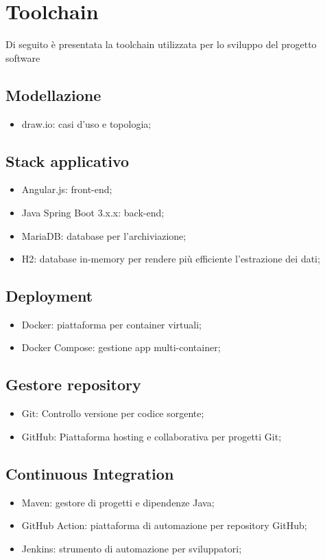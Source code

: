 \section{Toolchain}
Di seguito è presentata la toolchain utilizzata per lo sviluppo del progetto software
\subsection{Modellazione}
\begin{itemize}
	\item draw.io: casi d’uso e topologia;
\end{itemize}

\subsection{Stack applicativo}
\begin{itemize}
	\item Angular.js: front-end;
	\item Java Spring Boot 3.x.x: back-end;
	\item MariaDB: database per l’archiviazione;
	\item H2: database in-memory per rendere più efficiente l’estrazione dei dati;
\end{itemize}

\subsection{Deployment}
\begin{itemize}
	\item Docker: piattaforma per container virtuali;
	\item Docker Compose: gestione app multi-container;
\end{itemize}

\subsection{Gestore repository}
\begin{itemize}
	\item Git: Controllo versione per codice sorgente;
	\item GitHub: Piattaforma hosting e collaborativa per progetti Git;
\end{itemize}

\subsection{Continuous Integration}
\begin{itemize}
	\item Maven: gestore di progetti e dipendenze Java;
	\item GitHub Action: piattaforma di automazione per repository GitHub;
	\item Jenkins: strumento di automazione per sviluppatori;
\end{itemize}

